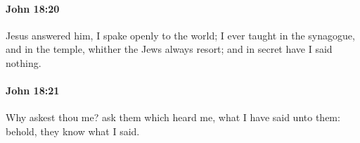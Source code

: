 		\paragraph{John 18:20} %
			\label{JOHN-18-20}

			Jesus answered him, I spake openly to the world; I ever taught in the synagogue, and in the temple, whither the Jews always resort; and in secret have I said nothing.

			\begin{framed}
				\scriptsize
				\begin{compactdesc}
					\item[SBLG] 
				\end{compactdesc}
			\end{framed}

		\paragraph{John 18:21} %
			\label{JOHN-18-21}

			Why askest thou me? ask them which heard me, what I have said unto them: behold, they know what I said.

